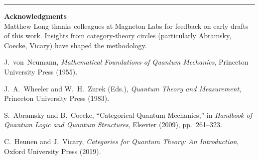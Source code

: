\documentclass[12pt]{article}
\begin{document}
\vspace{1em}
\hrule
\vspace{1em}

\noindent\textbf{Acknowledgments} \\
Matthew Long thanks colleagues at Magneton Labs for feedback on early drafts of this work. 
Insights from category-theory circles (particularly Abramsky, Coecke, Vicary) have shaped the methodology.

\vspace{1em}

\begin{thebibliography}{9}

J.~von~Neumann, 
\emph{Mathematical Foundations of Quantum Mechanics}, 
Princeton University Press (1955).

J.~A.~Wheeler and W.~H.~Zurek (Eds.), 
\emph{Quantum Theory and Measurement}, 
Princeton University Press (1983).

S.~Abramsky and B.~Coecke, 
``Categorical Quantum Mechanics,'' 
in \emph{Handbook of Quantum Logic and Quantum Structures}, 
Elsevier (2009), pp.~261--323.

C.~Heunen and J.~Vicary,
\emph{Categories for Quantum Theory: An Introduction},
Oxford University Press (2019).

\end{thebibliography}
\end{document}
